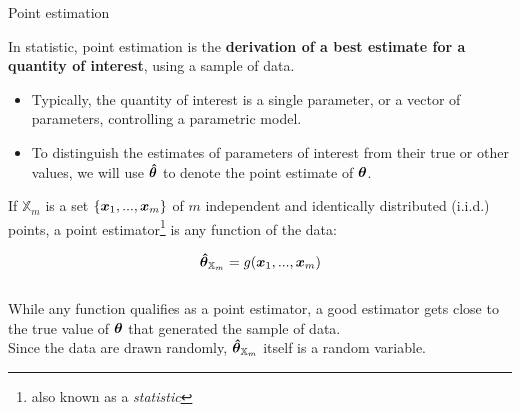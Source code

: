 
\begin{frame}[t]{Point estimation}

    In statistic, 
    \gls{point estimation}
    is the {\bf derivation of a best estimate
    for a quantity of interest}, using a sample of data.
    \begin{itemize}
        \item
        Typically, the quantity of interest is a 
        single parameter, or a vector of parameters, 
        controlling a parametric model.
        \item
        To distinguish the estimates of parameters of
        interest from their true or other values,
        we will use $\boldsymbol{\hat{\theta}}$ to denote the 
        point estimate of $\boldsymbol{\theta}$.
    \end{itemize}

    \vspace{0.1cm}

    If $\mathbb{X}_{m}$ is a set $\{\boldsymbol{x}_{1}, ..., \boldsymbol{x}_{m}\}$
    of $m$ independent and identically distributed (i.i.d.) points,
    a \gls{point estimator}\footnote{
        also known as a {\em statistic}} 
    is any function of the data:

    \begin{equation}
        \boldsymbol{\hat{\theta}}_{\mathbb{X}_{m}} = g(\boldsymbol{x}_{1}, ..., \boldsymbol{x}_{m})
        \label{eq:point_estimator}
    \end{equation}\\

    \vspace{0.2cm}
    While any function qualifies as a \gls{point estimator}, 
    a good estimator gets close to the true value of $\boldsymbol{\theta}$
    that generated the sample of data.\\

    \vspace{0.2cm}
    Since the data are drawn randomly, 
    $\boldsymbol{\hat{\theta}}_{\mathbb{X}_{m}}$ itself is a random variable.\\

\end{frame}